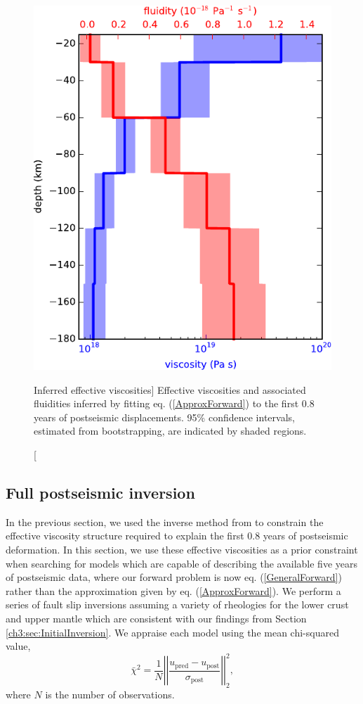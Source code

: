 \begin{figure}
\includegraphics[scale=1.0]{ch3/figures/2016jb013114-p12}
\caption
[Inferred effective viscosities]
{Effective viscosities and associated fluidities inferred by
fitting eq. (\ref{ApproxForward}) to the first 0.8 years of
postseismic displacements. 95\% confidence intervals, estimated from
bootstrapping, are indicated by shaded regions.}
\label{ch3:fig:EffectiveViscosity}
\end{figure} 

\subsection{Full postseismic inversion}\label{ch3:sec:FullInversion} 
In the previous section, we used the inverse method from
\citet{Hines2016} to constrain the effective viscosity structure
required to explain the first 0.8 years of postseismic deformation. In
this section, we use these effective viscosities as a prior constraint
when searching for models which are capable of describing the
available five years of postseismic data, where our forward problem is
now eq. (\ref{GeneralForward}) rather than the approximation given by
eq. (\ref{ApproxForward}).  We perform a series of fault slip
inversions assuming a variety of rheologies for the lower crust and
upper mantle which are consistent with our findings from Section
\ref{ch3:sec:InitialInversion}.  We appraise each model using the mean
chi-squared value,
\begin{equation}\label{ch3:eq:Misfit}
  \bar\chi^2 = \frac{1}{N}\left|\left|\frac{u_\mathrm{pred} - u_\mathrm{post}}{\sigma_\mathrm{post}}\right|\right|_2^2,
\end{equation}
where $N$ is the number of observations.

